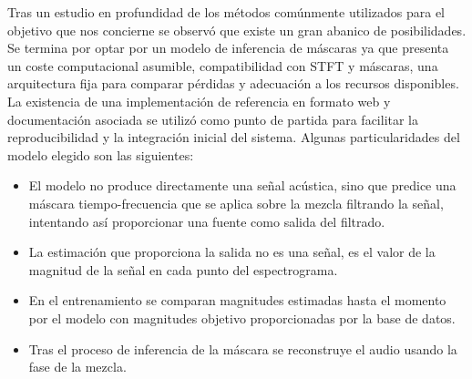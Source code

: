 Tras un estudio en profundidad de los métodos comúnmente utilizados para el objetivo que nos concierne se observó que existe un gran abanico de posibilidades. Se termina por optar por un modelo de inferencia de máscaras ya que presenta un coste computacional asumible, compatibilidad con STFT y máscaras, una arquitectura fija para comparar pérdidas y adecuación a los recursos disponibles. La existencia de una implementación de referencia en formato web y documentación asociada se utilizó como punto de partida para facilitar la reproducibilidad y la integración inicial del sistema.
Algunas particularidades del modelo elegido son las siguientes:

\begin{itemize}
    \item El modelo no produce directamente una señal acústica, sino que predice una máscara tiempo-frecuencia que se aplica sobre la mezcla filtrando la señal, intentando así proporcionar una fuente como salida del filtrado.
    \item La estimación que proporciona la salida no es una señal, es el valor de la magnitud de la señal en cada punto del espectrograma.  
    \item En el entrenamiento se comparan magnitudes estimadas hasta el momento por el modelo con magnitudes objetivo proporcionadas por la base de datos.
    \item Tras el proceso de inferencia de la máscara se reconstruye el audio usando la fase de la mezcla.
\end{itemize}
